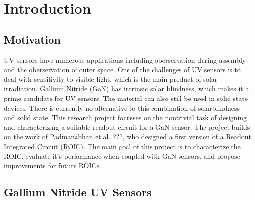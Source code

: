 \section{Introduction}\label{sec:introduction}

\subsection{Motivation}\label{ssec:motivation}
UV sensors have numerous applications including oberservation during assembly and the oberservation of outer space. One of the challenges of UV sensors is to deal with sensitivity to visible light, which is the main product of solar irradiation. Gallium Nitride (GaN) has intrinsic solar blindness, which makes it a prime candidate for UV sensors. The material can also still be used in solid state devices. There is currently no alternative to this combination of solarblindness and solid state. This research project focusses on the nontrivial task of designing and characterizing a suitable readout circuit for a GaN sensor. The project builds on the work of Padmanabhan et al. ???, who designed a first version of a Readout Integrated Circuit (ROIC). The main goal of this project is to characterize the ROIC, evaluate it's performance when coupled with GaN sensors, and propose improvements for future ROICs.

\subsection{Gallium Nitride UV Sensors}\label{ssec:gallium_nitride_uv_sensors}



